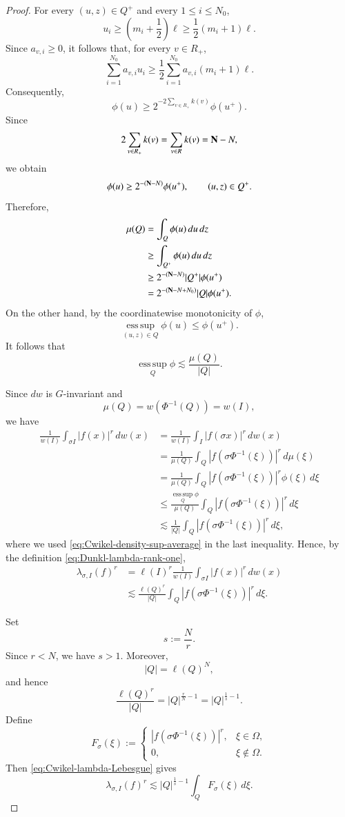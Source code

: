 \documentclass[12pt]{amsart}
\begin{document}
\begin{proof}
For every $(u,z)\in Q^+$ and every $1\leq i\leq N_0$,
\[
u_i
\geq
\left(m_i+\frac12\right)\ell
\geq
\frac12(m_i+1)\ell.
\]
Since $a_{v,i}\geq0$, it follows that, for every $v\in R_+$,
\[
\sum_{i=1}^{N_0}a_{v,i}u_i
\geq
\frac12
\sum_{i=1}^{N_0}a_{v,i}(m_i+1)\ell.
\]
Consequently,
\[
\phi(u)
\geq
2^{-2\sum_{v\in R_+}k(v)}
\phi(u^+).
\]
Since
\[
2\sum_{v\in R_+}k(v)
=
\sum_{v\in R}k(v)
=
{\bf N}-N,
\]
we obtain
\[
\phi(u)
\geq
2^{-({\bf N}-N)}
\phi(u^+),
\qquad
(u,z)\in Q^+.
\]
Therefore,
\begin{align*}
\mu(Q)
&=
\int_Q\phi(u)\,du\,dz
\\
&\geq
\int_{Q^+}\phi(u)\,du\,dz
\\
&\geq
2^{-({\bf N}-N)}
|Q^+|\phi(u^+)
\\
&=
2^{-({\bf N}-N+N_0)}
|Q|\phi(u^+).
\end{align*}
On the other hand, by the coordinatewise monotonicity of $\phi$,
\[
\operatorname*{ess\,sup}_{(u,z)\in Q}\phi(u)
\leq
\phi(u^+).
\]
It follows that
\begin{equation}\label{eq:Cwikel-density-sup-average}
\operatorname*{ess\,sup}_{Q}\phi
\lesssim
\frac{\mu(Q)}{|Q|}.
\end{equation}

Since $dw$ is $G$-invariant and
\[
\mu(Q)=w(\Phi^{-1}(Q))=w(I),
\]
we have
\begin{align*}
\frac{1}{w(I)}
\int_{\sigma I}|f(x)|^r\,dw(x)
&=
\frac{1}{w(I)}
\int_I|f(\sigma x)|^r\,dw(x)
\\
&=
\frac{1}{\mu(Q)}
\int_Q
|f(\sigma\Phi^{-1}(\xi))|^r\,d\mu(\xi)
\\
&=
\frac{1}{\mu(Q)}
\int_Q
|f(\sigma\Phi^{-1}(\xi))|^r
\phi(\xi)\,d\xi
\\
&\leq
\frac{\operatorname*{ess\,sup}_{Q}\phi}{\mu(Q)}
\int_Q
|f(\sigma\Phi^{-1}(\xi))|^r\,d\xi
\\
&\lesssim
\frac1{|Q|}
\int_Q
|f(\sigma\Phi^{-1}(\xi))|^r\,d\xi,
\end{align*}
where we used \eqref{eq:Cwikel-density-sup-average} in the last
inequality. Hence, by the definition
\eqref{eq:Dunkl-lambda-rank-one},
\begin{align}
\lambda_{\sigma,I}(f)^r
&=
\ell(I)^r
\frac1{w(I)}
\int_{\sigma I}|f(x)|^r\,dw(x)
\nonumber\\
&\lesssim
\frac{\ell(Q)^r}{|Q|}
\int_Q
|f(\sigma\Phi^{-1}(\xi))|^r\,d\xi.
\label{eq:Cwikel-lambda-Lebesgue}
\end{align}

Set
\[
s:=\frac Nr.
\]
Since $r<N$, we have $s>1$. Moreover,
\[
|Q|=\ell(Q)^N,
\]
and hence
\[
\frac{\ell(Q)^r}{|Q|}
=
|Q|^{\frac rN-1}
=
|Q|^{\frac1s-1}.
\]
Define
\[
F_\sigma(\xi)
:=
\begin{cases}
|f(\sigma\Phi^{-1}(\xi))|^r,
&\xi\in\Omega,\\
0,
&\xi\notin\Omega.
\end{cases}
\]
Then \eqref{eq:Cwikel-lambda-Lebesgue} gives
\begin{equation}\label{eq:Cwikel-lambda-dyadic}
\lambda_{\sigma,I}(f)^r
\lesssim
|Q|^{\frac1s-1}
\int_QF_\sigma(\xi)\,d\xi.
\end{equation}


\end{proof}
\end{document}
